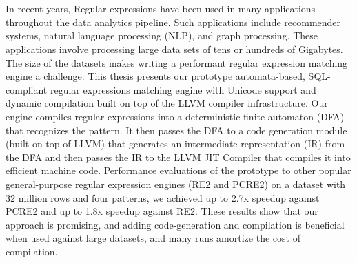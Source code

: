 \chapter{\abstractname}
In recent years, Regular expressions have been used in many applications throughout the data analytics pipeline. Such applications include recommender systems, natural language processing (NLP), and graph processing. These applications involve processing large data sets of tens or hundreds of Gigabytes. The size of the datasets makes writing a performant regular expression matching engine a challenge. This thesis presents our prototype automata-based, SQL-compliant regular expressions matching engine with Unicode support and dynamic compilation built on top of the LLVM compiler infrastructure. Our engine compiles regular expressions into a deterministic finite automaton (DFA) that recognizes the pattern. It then passes the DFA to a code generation module (built on top of LLVM) that generates an intermediate representation (IR) from the DFA and then passes the IR to the LLVM JIT Compiler that compiles it into efficient machine code. Performance evaluations of the prototype to other popular general-purpose regular expression engines (RE2 and PCRE2) on a dataset with 32 million rows and four patterns, we achieved up to 2.7x speedup against PCRE2 and up to 1.8x speedup against RE2. These results show that our approach is promising, and adding code-generation and compilation is beneficial when used against large datasets, and many runs amortize the cost of compilation.